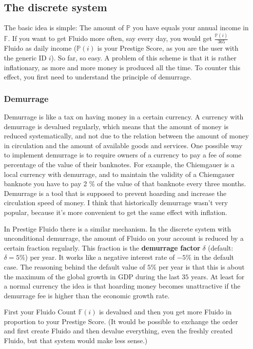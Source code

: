 \documentclass[a4paper,12pt]{scrartcl}
\newcounter{example}
\begin{document}
\subsection{The discrete system}
The basic idea is simple: The amount of $\mathbb{P}$ you have equals your annual income in $\mathbb{F}$. If you want to get Fluido more often, say every day, you would get $\frac{\mathbb{P}(i)}{365}$ Fluido as daily income ($\mathbb{P}(i)$ is your Prestige Score, as you are the user with the generic ID $i$). So far, so easy. A problem of this scheme is that it is rather inflationary, as more and more money is produced all the time. To counter this effect, you first need to understand the principle of demurrage. 

\subsubsection{Demurrage}
Demurrage is like a tax on having money in a certain currency. A currency with demurrage is devalued regularly, which means that the amount of money is reduced systematically, and not due to the relation between the amount of money in circulation and the amount of available goods and services. One possible way to implement demurrage is to require owners of a currency to pay a fee of some percentage of the value of their banknotes. For example, the Chiemgauer is a local currency with demurrage, and to maintain the validity of a Chiemgauer banknote you have to pay 2 \% of the value of that banknote every three months. Demurrage is a tool that is supposed to prevent hoarding and increase the circulation speed of money. I think that historically demurrage wasn't very popular, because it's more convenient to get the same effect with inflation.

In Prestige Fluido there is a similar mechanism. In the discrete system with unconditional demurrage, the amount of Fluido on your account is reduced by a certain fraction regularly. This fraction is the \textbf{demurrage factor} $\delta$ (default: $\delta = 5 \%$) per year. It works like a negative interest rate of $-5 \%$ in the default case. The reasoning behind the default value of $5 \%$ per year is that this is about the maximum of the global growth in GDP during the last $35$ years. At least for a normal currency the idea is that hoarding money becomes unattractive if the demurrage fee is higher than the economic growth rate.

First your Fluido Count $\mathbb{F}(i)$ is devalued and then you get more Fluido in proportion to your Prestige Score. (It would be possible to exchange the order and first create Fluido and then devalue everything, even the freshly created Fluido, but that system would make less sense.)
\end{document}
